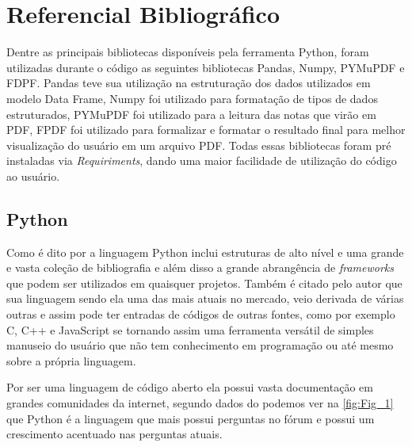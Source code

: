 
\section{\textbf{Referencial Bibliográfico}}%

Dentre as principais bibliotecas disponíveis pela ferramenta Python, foram utilizadas durante o código as seguintes bibliotecas Pandas, Numpy, PYMuPDF e FDPF. Pandas teve sua utilização na estruturação dos dados utilizados em modelo Data Frame, Numpy foi utilizado para formatação de tipos de dados estruturados, PYMuPDF foi utilizado para a leitura das notas que virão em PDF, FPDF foi utilizado para formalizar e formatar o resultado final para melhor visualização do usuário em um arquivo PDF. Todas essas bibliotecas foram pré instaladas via \textit{Requiriments}, dando uma maior facilidade de utilização do código ao usuário.


\subsection{Python}\label{sec:Python}
%
Como é dito por \textcite{borges2014python} a linguagem Python inclui estruturas de alto nível e uma grande e vasta coleção de bibliografia e além disso a grande abrangência de \textit{frameworks} que podem ser utilizados em quaisquer projetos. Também é citado pelo autor que sua linguagem sendo ela uma das mais atuais no mercado, veio derivada de várias outras e assim pode ter entradas de códigos de outras fontes, como por exemplo C, C++ e JavaScript se tornando assim uma ferramenta versátil de simples manuseio do usuário que não tem conhecimento em programação ou até mesmo sobre a própria linguagem.

\par Por ser uma linguagem de código aberto ela possui vasta documentação em grandes comunidades da internet, segundo dados do \textcite{StackOverflow}
podemos ver na \autoref{fig:Fig_1} que Python é a linguagem que mais possui perguntas no fórum e possui um crescimento acentuado nas perguntas atuais.

